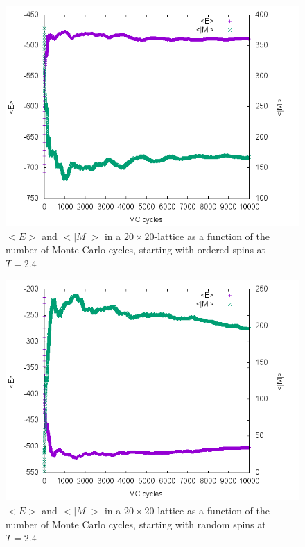 \documentclass[10pt,a4paper]{article}
\begin{document}
\begin{figure}[h]
	\includegraphics[width=\textwidth]{a24o.png}
	\caption{$<E>$ and $<|M|>$ in a $20\times 20$-lattice as a function of the number of Monte Carlo cycles, starting with ordered spins at $T=2.4$\label{c_3}}
\end{figure}
\begin{figure}[h]
	\includegraphics[width=\textwidth]{a24r.png}
	\caption{$<E>$ and $<|M|>$ in a $20\times 20$-lattice as a function of the number of Monte Carlo cycles, starting with random spins at $T=2.4$\label{c_4}}
\end{figure}
\end{document}
